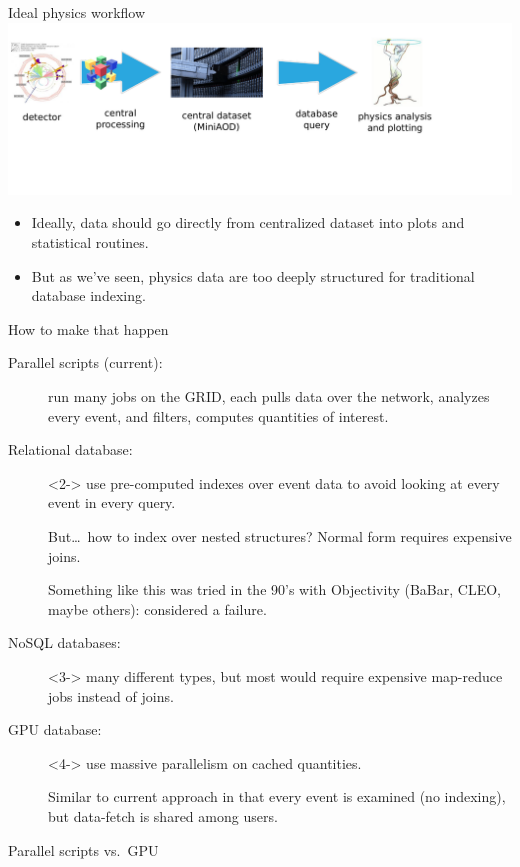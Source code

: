 \documentclass{beamer}
\begin{document}
\begin{frame}{Ideal physics workflow}
\vspace{0.5 cm}
\includegraphics[width=\linewidth]{workflow3.pdf}

\vspace{0.25 cm}
\begin{itemize}
\item Ideally, data should go directly from centralized dataset into plots and statistical routines.
\item<2-> But as we've seen, physics data are too deeply structured for traditional database indexing.
\end{itemize}

\vspace{1 cm}
\end{frame}

\begin{frame}{How to make that happen}
\vspace{0.25 cm}
\small
\begin{description}
\item[Parallel scripts (current):] run many jobs on the GRID, each pulls data over the network, analyzes every event, and filters, computes quantities of interest.

\item[Relational database:]<2-> use pre-computed indexes over event data to avoid looking at every event in every query.

\vspace{0.2 cm}
But\ldots\ how to index over nested structures? Normal form requires expensive joins.

\vspace{0.2 cm}
Something like this was tried in the 90's with Objectivity (BaBar, CLEO, maybe others): considered a failure.

\item[NoSQL databases:]<3-> many different types, but most would require expensive map-reduce jobs instead of joins.

\item[GPU database:]<4-> use massive parallelism on cached quantities.

\vspace{0.2 cm}
Similar to current approach in that every event is examined (no indexing), but data-fetch is shared among users.
\end{description}
\end{frame}

\begin{frame}{Parallel scripts vs.\ GPU}




\end{frame}
\end{document}
